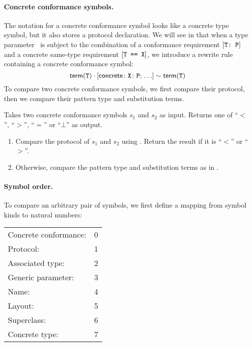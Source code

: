 \documentclass[../generics]{subfiles}
\begin{document}
\paragraph{Concrete conformance symbols.} The notation for a concrete conformance symbol looks like a concrete type symbol, but it also stores a protocol declaration. We will see in  that when a type parameter \tT\ is subject to the combination of a conformance requirement $[\texttt{T:~P}]$ and a concrete same-type requirement $[\texttt{T == X}]$, we introduce a rewrite rule containing a concrete conformance symbol:
\[\mathsf{term}(\texttt{T})\cdot[\mathsf{concrete}\colon \texttt{X}\colon\texttt{P};\,\ldots] \sim \mathsf{term}(\texttt{T})\]
To compare two concrete conformance symbols, we first compare their protocol, then we compare their pattern type and substitution terms.
\begin{algorithm}\label{concrete conformance reduction order}
Takes two concrete conformance symbols $s_1$ and $s_2$ as input. Returns one of ``$<$'', ``$>$'', ``$=$'' or \index{$\bot$}``$\bot$'' as output.
\begin{enumerate}
\item Compare the protocol of $s_1$ and $s_2$ using . Return the result if it is ``$<$'' or ``$>$''.
\item Otherwise, compare the pattern type and substitution terms as in .
\end{enumerate}
\end{algorithm}

\paragraph{Symbol order.} To compare an arbitrary pair of symbols, we first define a mapping from symbol kinds to natural numbers:
\begin{center}
\begin{tabular}{ll}
\toprule
Concrete conformance:&0\\
Protocol:&1\\
Associated type:&2\\
Generic parameter:&3\\
Name:&4\\
Layout:&5\\
Superclass:&6\\
Concrete type:&7\\
\bottomrule
\end{tabular}
\end{center}
\end{document}
